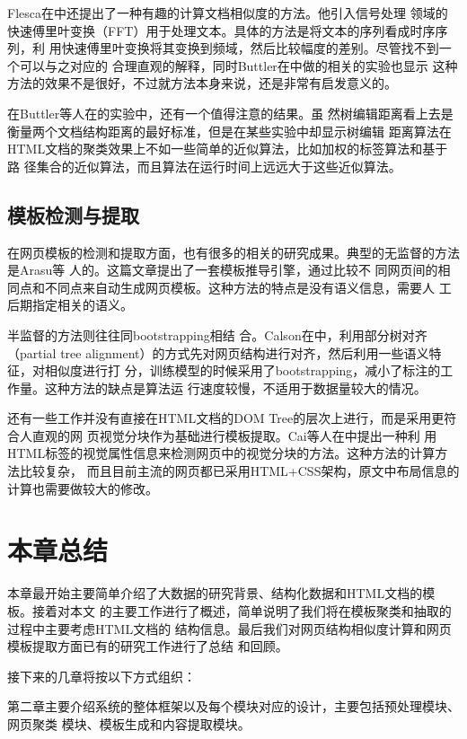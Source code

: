 Flesca在\cite{fft}中还提出了一种有趣的计算文档相似度的方法。他引入信号处理
领域的快速傅里叶变换（FFT）用于处理文本。具体的方法是将文本的序列看成时序序列，利
用快速傅里叶变换将其变换到频域，然后比较幅度的差别。尽管找不到一个可以与之对应的
合理直观的解释，同时Buttler在\cite{buttler2004short}中做的相关的实验也显示
这种方法的效果不是很好，不过就方法本身来说，还是非常有启发意义的。

在Buttler等人在\cite{buttler2004short}的实验中，还有一个值得注意的结果。虽
然树编辑距离看上去是衡量两个文档结构距离的最好标准，但是在某些实验中却显示树编辑
距离算法在HTML文档的聚类效果上不如一些简单的近似算法，比如加权的标签算法和基于路
径集合的近似算法，而且算法在运行时间上远远大于这些近似算法。

\subsection{模板检测与提取}
\label{sec:relatedwork:template}
在网页模板的检测和提取方面，也有很多的相关的研究成果。典型的无监督的方法是Arasu等
人的\cite{arasu2003extracting}。这篇文章提出了一套模板推导引擎，通过比较不
同网页间的相同点和不同点来自动生成网页模板。这种方法的特点是没有语义信息，需要人
工后期指定相关的语义。

半监督的方法则往往同bootstrapping相结
合。Calson在\cite{carlson2008bootstrapping}中，利用部分树对齐（partial
tree alignment）的方式先对网页结构进行对齐，然后利用一些语义特征，对相似度进行打
分，训练模型的时候采用了bootstrapping，减小了标注的工作量。这种方法的缺点是算法运
行速度较慢，不适用于数据量较大的情况。

还有一些工作并没有直接在HTML文档的DOM Tree的层次上进行，而是采用更符合人直观的网
页视觉分块作为基础进行模板提取。Cai等人在\cite{cai2003vips}中提出一种利
用HTML标签的视觉属性信息来检测网页中的视觉分块的方法。这种方法的计算方法比较复杂，
而且目前主流的网页都已采用HTML+CSS架构，原文中布局信息的计算也需要做较大的修改。
\section{本章总结}
\label{sec:summaryintro}
本章最开始主要简单介绍了大数据的研究背景、结构化数据和HTML文档的模板。接着对本文
的主要工作进行了概述，简单说明了我们将在模板聚类和抽取的过程中主要考虑HTML文档的
结构信息。最后我们对网页结构相似度计算和网页模板提取方面已有的研究工作进行了总结
和回顾。

接下来的几章将按以下方式组织：

第二章主要介绍系统的整体框架以及每个模块对应的设计，主要包括预处理模块、网页聚类
模块、模板生成和内容提取模块。

